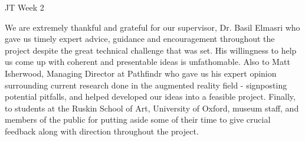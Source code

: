 JT Week 2

We are extremely thankful and grateful for our supervisor, Dr. Basil Elmasri who gave us timely expert advice, guidance and encouragement throughout the project despite the great technical challenge that was set. His willingness to help us come up with coherent and presentable ideas is unfathomable. Also to Matt Isherwood, Managing Director at Pathfindr who gave us his expert opinion surrounding current research done in the augmented reality field - signposting potential pitfalls, and helped developed our ideas into a feasible project. Finally, to students at the Ruskin School of Art, University of Oxford, museum staff, and members of the public for putting aside some of their time to give crucial feedback along with direction throughout the project.